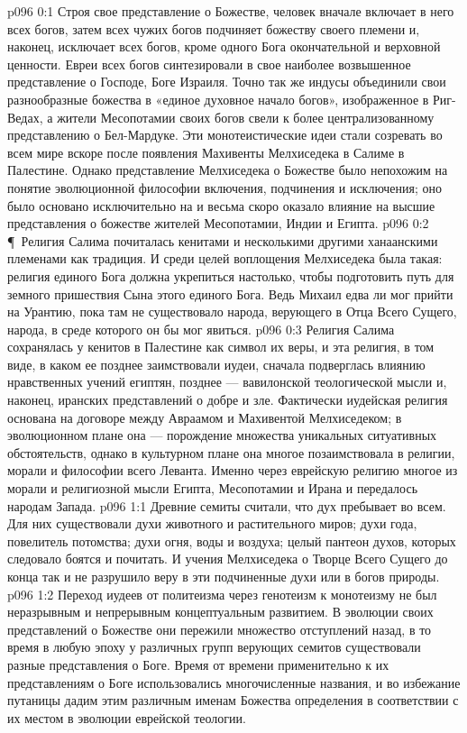 \vs p096 0:1 Строя свое представление о Божестве, человек вначале включает в него всех богов, затем всех чужих богов подчиняет божеству своего племени и, наконец, исключает всех богов, кроме одного Бога окончательной и верховной ценности. Евреи всех богов синтезировали в свое наиболее возвышенное представление о Господе, Боге Израиля. Точно так же индусы объединили свои разнообразные божества в «единое духовное начало богов», изображенное в Риг\hyp{}Ведах, а жители Месопотамии своих богов свели к более централизованному представлению о Бел\hyp{}Мардуке. Эти монотеистические идеи стали созревать во всем мире вскоре после появления Махивенты Мелхиседека в Салиме в Палестине. Однако представление Мелхиседека о Божестве было непохожим на понятие эволюционной философии включения, подчинения и исключения; оно было основано исключительно на  и весьма скоро оказало влияние на высшие представления о божестве жителей Месопотамии, Индии и Египта.
\vs p096 0:2 \P\ Религия Салима почиталась кенитами и несколькими другими ханаанскими племенами как традиция. И среди целей воплощения Мелхиседека была такая: религия единого Бога должна укрепиться настолько, чтобы подготовить путь для земного пришествия Сына этого единого Бога. Ведь Михаил едва ли мог прийти на Урантию, пока там не существовало народа, верующего в Отца Всего Сущего, народа, в среде которого он бы мог явиться.
\vs p096 0:3 Религия Салима сохранялась у кенитов в Палестине как символ их веры, и эта религия, в том виде, в каком ее позднее заимствовали иудеи, сначала подверглась влиянию нравственных учений египтян, позднее --- вавилонской теологической мысли и, наконец, иранских представлений о добре и зле. Фактически иудейская религия основана на договоре между Авраамом и Махивентой Мелхиседеком; в эволюционном плане она --- порождение множества уникальных ситуативных обстоятельств, однако в культурном плане она многое позаимствовала в религии, морали и философии всего Леванта. Именно через еврейскую религию многое из морали и религиозной мысли Египта, Месопотамии и Ирана и передалось народам Запада.
\vs p096 1:1 Древние семиты считали, что дух пребывает во всем. Для них существовали духи животного и растительного миров; духи года, повелитель потомства; духи огня, воды и воздуха; целый пантеон духов, которых следовало боятся и почитать. И учения Мелхиседека о Творце Всего Сущего до конца так и не разрушило веру в эти подчиненные духи или в богов природы.
\vs p096 1:2 Переход иудеев от политеизма через генотеизм к монотеизму не был неразрывным и непрерывным концептуальным развитием. В эволюции своих представлений о Божестве они пережили множество отступлений назад, в то время в любую эпоху у различных групп верующих семитов существовали разные представления о Боге. Время от времени применительно к их представлениям о Боге использовались многочисленные названия, и во избежание путаницы дадим этим различным именам Божества определения в соответствии с их местом в эволюции еврейской теологии.

